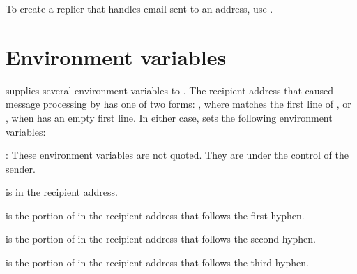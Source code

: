 To create a replier that handles email sent to an address, use
.


\section{Environment variables}
 supplies several environment variables to .
The recipient address that caused message processing by 
has one of two forms: ,
where  matches the first line of
, or , when
 has an empty first line.  In either case,
 sets the following environment variables:

: These environment variables are not quoted.  They
are under the control of the sender.


 is  in the recipient address.

 is the portion of  in the recipient
address that follows the first hyphen.

 is the portion of  in the recipient
address that follows the second hyphen.

 is the portion of  in the recipient
address that follows the third hyphen.

